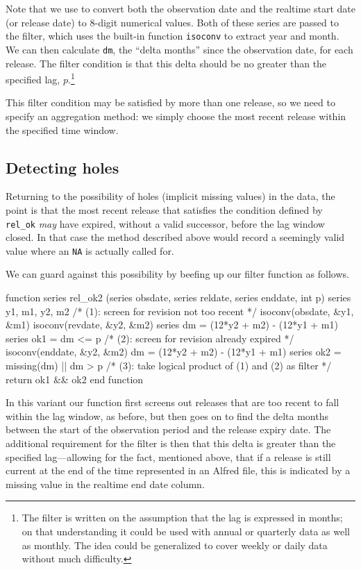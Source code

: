 Note that we use  to convert both the observation
date and the realtime start date (or release date) to 8-digit
numerical values. Both of these series are passed to the filter, which
uses the built-in function \texttt{isoconv} to extract year and month.
We can then calculate \texttt{dm}, the ``delta months'' since the
observation date, for each release.  The filter condition is that this
delta should be no greater than the specified lag, $p$.\footnote{The
  filter is written on the assumption that the lag is expressed in
  months; on that understanding it could be used with annual or
  quarterly data as well as monthly. The idea could be generalized to
  cover weekly or daily data without much difficulty.}

This filter condition may be satisfied by more than one release, so we
need to specify an aggregation method: we simply choose the most
recent release within the specified time window.

\subsection{Detecting holes}

Returning to the possibility of holes (implicit missing values) in the
data, the point is that the most recent release that satisfies the
condition defined by \verb|rel_ok| \textit{may} have expired, without
a valid successor, before the lag window closed. In that case the
method described above would record a seemingly valid value where an
\texttt{NA} is actually called for.

We can guard against this possibility by beefing up our filter function
as follows.
%
\begin{code}
function series rel_ok2 (series obsdate, series reldate,
                         series enddate, int p)
  series y1, m1, y2, m2
  /* (1): screen for revision not too recent */
  isoconv(obsdate, &y1, &m1)
  isoconv(revdate, &y2, &m2)
  series dm = (12*y2 + m2) - (12*y1 + m1)
  series ok1 = dm <= p
  /* (2): screen for revision already expired */
  isoconv(enddate, &y2, &m2)
  dm = (12*y2 + m2) - (12*y1 + m1)
  series ok2 = missing(dm) || dm > p
  /* (3): take logical product of (1) and (2) as filter */
  return ok1 && ok2
end function
\end{code}

In this variant our function first screens out releases that are too
recent to fall within the lag window, as before, but then goes on to
find the delta months between the start of the observation period and
the release expiry date. The additional requirement for the filter is
then that this delta is greater than the specified lag---allowing for
the fact, mentioned above, that if a release is still current at the
end of the time represented in an Alfred file, this is indicated by a
missing value in the realtime end date column.

